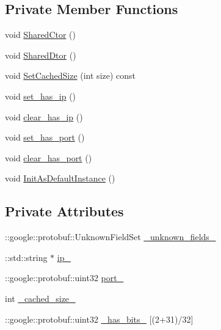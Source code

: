 \subsection*{Private Member Functions}
\begin{DoxyCompactItemize}
\item 
void \hyperlink{class_i_m_1_1_base_define_1_1_ip_addr_a53e034767d54156813519958e65cacbb}{Shared\+Ctor} ()
\item 
void \hyperlink{class_i_m_1_1_base_define_1_1_ip_addr_aa767036c6d08b79ebc67da8c5a72ce91}{Shared\+Dtor} ()
\item 
void \hyperlink{class_i_m_1_1_base_define_1_1_ip_addr_a38589e4cbdfc9c41fb63b2d822769004}{Set\+Cached\+Size} (int size) const 
\item 
void \hyperlink{class_i_m_1_1_base_define_1_1_ip_addr_aab48afb8b4a3d4dc3933d0c3e9109005}{set\+\_\+has\+\_\+ip} ()
\item 
void \hyperlink{class_i_m_1_1_base_define_1_1_ip_addr_ae9f8521332e3cc31b0cb0a02d6841c54}{clear\+\_\+has\+\_\+ip} ()
\item 
void \hyperlink{class_i_m_1_1_base_define_1_1_ip_addr_a3e6848529eedb37977a0a1789c308c23}{set\+\_\+has\+\_\+port} ()
\item 
void \hyperlink{class_i_m_1_1_base_define_1_1_ip_addr_a5adfd55642c284627cf4e6471307e92d}{clear\+\_\+has\+\_\+port} ()
\item 
void \hyperlink{class_i_m_1_1_base_define_1_1_ip_addr_a56cc108fd2e4def6a244f07e4cbc86c5}{Init\+As\+Default\+Instance} ()
\end{DoxyCompactItemize}
\subsection*{Private Attributes}
\begin{DoxyCompactItemize}
\item 
\+::google\+::protobuf\+::\+Unknown\+Field\+Set \hyperlink{class_i_m_1_1_base_define_1_1_ip_addr_aaffffca09be83880ab20ca78d8ce5cbc}{\+\_\+unknown\+\_\+fields\+\_\+}
\item 
\+::std\+::string $\ast$ \hyperlink{class_i_m_1_1_base_define_1_1_ip_addr_a53891fc9cf2c47005301146dfd49c886}{ip\+\_\+}
\item 
\+::google\+::protobuf\+::uint32 \hyperlink{class_i_m_1_1_base_define_1_1_ip_addr_aa99a859ecdfacb9e0c8ba90711bce58c}{port\+\_\+}
\item 
int \hyperlink{class_i_m_1_1_base_define_1_1_ip_addr_ad8aef4fc2495764c30d09c136ef3e017}{\+\_\+cached\+\_\+size\+\_\+}
\item 
\+::google\+::protobuf\+::uint32 \hyperlink{class_i_m_1_1_base_define_1_1_ip_addr_a6f88e4a8ffcb35f118fcdbfb383d0ed3}{\+\_\+has\+\_\+bits\+\_\+} \mbox{[}(2+31)/32\mbox{]}
\end{DoxyCompactItemize}

